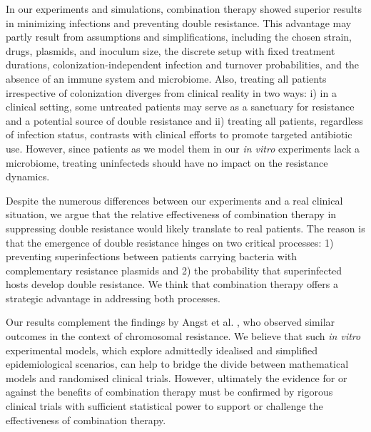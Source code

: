 In our experiments and simulations, combination therapy showed superior results in minimizing infections and preventing double resistance.
This advantage may partly result from assumptions and simplifications, including the chosen strain, drugs, plasmids, and inoculum size, the discrete setup with fixed treatment durations, colonization-independent infection and turnover probabilities, and the absence of an immune system and microbiome.
Also, treating all patients irrespective of colonization diverges from clinical reality in two ways:
i) in a clinical setting, some untreated patients may serve as a sanctuary for resistance and a potential source of double resistance and
ii) treating all patients, regardless of infection status, contrasts with clinical efforts to promote targeted antibiotic use.
However, since patients as we model them in our \textit{in vitro} experiments lack a microbiome, treating uninfecteds should have no impact on the resistance dynamics.

Despite the numerous differences between our experiments and a real clinical situation, we argue that the relative effectiveness of combination therapy in suppressing double resistance would likely translate to real patients.
The reason is that the emergence of double resistance hinges on two critical processes: 1) preventing superinfections between patients carrying bacteria with complementary resistance plasmids and 2) the probability that superinfected hosts develop double resistance.
We think that combination therapy offers a strategic advantage in addressing both processes.

Our results complement the findings by Angst et al. \cite{Angst2021}, who observed similar outcomes in the context of chromosomal resistance. We believe that such \textit{in vitro} experimental models, which explore admittedly idealised and simplified epidemiological scenarios, can help to bridge the divide between mathematical models and randomised clinical trials. However, ultimately the evidence for or against the benefits of combination therapy must be confirmed by rigorous clinical trials with sufficient statistical power to support or challenge the effectiveness of combination therapy.
